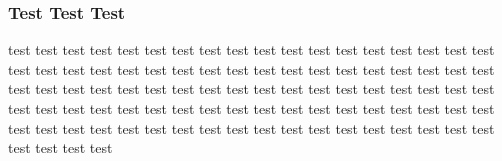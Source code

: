 \documentclass[t]{beamer}
\begin{document}
    \begin{frame}
        \frametitle{Test Test Test}
        test test test test test test test test test test test test test test test test test test test test test test test test test test test test test test test test test test test test test test test test test test test test test test test test test test test test test test test test test test test test test test test test test test test test test test test test test test test test test test test test test test test test test test test test test test test test test  test
    \end{frame}
\end{document}

